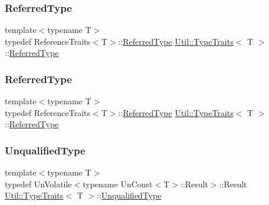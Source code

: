 \mbox{\label{classUtil_1_1TypeTraits_a89aec1a9db97b7f70e59b6738c5df4f9}} 
\subsubsection{\texorpdfstring{ReferredType}{ReferredType}\hspace{0.1cm}{\footnotesize\ttfamily [2/3]}}
{\footnotesize\ttfamily template$<$typename T$>$ \\
typedef Reference\+Traits$<$T$>$\+::\mbox{\hyperlink{classUtil_1_1TypeTraits_a89aec1a9db97b7f70e59b6738c5df4f9}{Referred\+Type}} \mbox{\hyperlink{classUtil_1_1TypeTraits}{Util\+::\+Type\+Traits}}$<$ T $>$\+::\mbox{\hyperlink{classUtil_1_1TypeTraits_a89aec1a9db97b7f70e59b6738c5df4f9}{Referred\+Type}}}

\mbox{\label{classUtil_1_1TypeTraits_a89aec1a9db97b7f70e59b6738c5df4f9}} 
\subsubsection{\texorpdfstring{ReferredType}{ReferredType}\hspace{0.1cm}{\footnotesize\ttfamily [3/3]}}
{\footnotesize\ttfamily template$<$typename T$>$ \\
typedef Reference\+Traits$<$T$>$\+::\mbox{\hyperlink{classUtil_1_1TypeTraits_a89aec1a9db97b7f70e59b6738c5df4f9}{Referred\+Type}} \mbox{\hyperlink{classUtil_1_1TypeTraits}{Util\+::\+Type\+Traits}}$<$ T $>$\+::\mbox{\hyperlink{classUtil_1_1TypeTraits_a89aec1a9db97b7f70e59b6738c5df4f9}{Referred\+Type}}}

\mbox{\label{classUtil_1_1TypeTraits_a9d25b7cafbc7acafa3275b5fe5a04ee0}} 
\subsubsection{\texorpdfstring{UnqualifiedType}{UnqualifiedType}\hspace{0.1cm}{\footnotesize\ttfamily [1/3]}}
{\footnotesize\ttfamily template$<$typename T$>$ \\
typedef Un\+Volatile$<$typename Un\+Const$<$T$>$\+::Result$>$\+::Result \mbox{\hyperlink{classUtil_1_1TypeTraits}{Util\+::\+Type\+Traits}}$<$ T $>$\+::\mbox{\hyperlink{classUtil_1_1TypeTraits_a9d25b7cafbc7acafa3275b5fe5a04ee0}{Unqualified\+Type}}}

